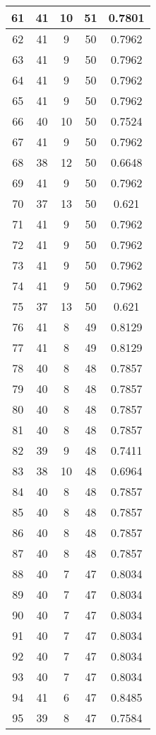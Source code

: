 \documentclass[letterpaper, 12pt]{article}
\begin{document}
\begin{longtable}{|c|c|c|c|c|}
\hline
61 & 41 & 10 & 51 & 0.7801 \\
\hline
62 & 41 & 9 & 50 & 0.7962 \\
\hline
63 & 41 & 9 & 50 & 0.7962 \\
\hline
64 & 41 & 9 & 50 & 0.7962 \\
\hline
65 & 41 & 9 & 50 & 0.7962 \\
\hline
66 & 40 & 10 & 50 & 0.7524 \\
\hline
67 & 41 & 9 & 50 & 0.7962 \\
\hline
68 & 38 & 12 & 50 & 0.6648 \\
\hline
69 & 41 & 9 & 50 & 0.7962 \\
\hline
70 & 37 & 13 & 50 & 0.621 \\
\hline
71 & 41 & 9 & 50 & 0.7962 \\
\hline
72 & 41 & 9 & 50 & 0.7962 \\
\hline
73 & 41 & 9 & 50 & 0.7962 \\
\hline
74 & 41 & 9 & 50 & 0.7962 \\
\hline
75 & 37 & 13 & 50 & 0.621 \\
\hline
76 & 41 & 8 & 49 & 0.8129 \\
\hline
77 & 41 & 8 & 49 & 0.8129 \\
\hline
78 & 40 & 8 & 48 & 0.7857 \\
\hline
79 & 40 & 8 & 48 & 0.7857 \\
\hline
80 & 40 & 8 & 48 & 0.7857 \\
\hline
81 & 40 & 8 & 48 & 0.7857 \\
\hline
82 & 39 & 9 & 48 & 0.7411 \\
\hline
83 & 38 & 10 & 48 & 0.6964 \\
\hline
84 & 40 & 8 & 48 & 0.7857 \\
\hline
85 & 40 & 8 & 48 & 0.7857 \\
\hline
86 & 40 & 8 & 48 & 0.7857 \\
\hline
87 & 40 & 8 & 48 & 0.7857 \\
\hline
88 & 40 & 7 & 47 & 0.8034 \\
\hline
89 & 40 & 7 & 47 & 0.8034 \\
\hline
90 & 40 & 7 & 47 & 0.8034 \\
\hline
91 & 40 & 7 & 47 & 0.8034 \\
\hline
92 & 40 & 7 & 47 & 0.8034 \\
\hline
93 & 40 & 7 & 47 & 0.8034 \\
\hline
94 & 41 & 6 & 47 & 0.8485 \\
\hline
95 & 39 & 8 & 47 & 0.7584 \\

\end{longtable}
\end{document}
